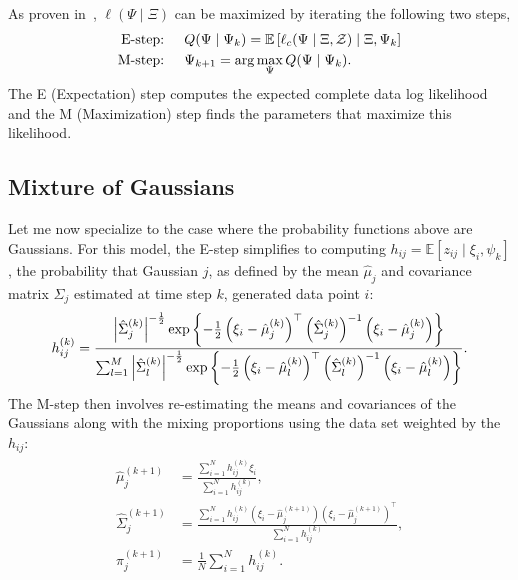 As proven in~\cite{dempster1977maximum}, $\ell(\Psi \mid \Xi)$ can be maximized
by iterating the following two steps,
%
\begin{align}
    \begin{split}
    \text{E-step: } \quad &Q(\Psi \mid \Psi_k) = \mathbb{E}\left[ \ell_c(\Psi \mid \Xi, \mathcal{Z}) \mid \Xi, \Psi_k \right] \\
    \text{M-step: } \quad &\Psi_{k+1} = \arg \max_\Psi Q(\Psi \mid \Psi_k).
    \end{split}
    \label{eq:EM_alg}
\end{align}
%
The E (Expectation) step computes the expected complete data log likelihood and 
the M (Maximization) step finds the parameters that maximize this likelihood.

\subsection{Mixture of Gaussians}
Let me now specialize to the case where the probability functions above are
Gaussians. For this model, the E-step simplifies to computing $h_{ij} =
\mathbb{E}\left[ z_{ij} \mid \xi_i, \psi_k \right]$, the probability that
Gaussian $j$, as defined by the mean $\hat{\mu}_j$ and covariance matrix
$\hat{\Sigma}_j$ estimated at time step $k$, generated data point $i$:
%
\begin{equation}
    h_{ij}^{(k)} = \frac{\left|{\hat{\Sigma}_j^{(k)}}\right|^{-\frac{1}{2}} 
    \exp{\left\{-\frac{1}{2}\left( \xi_i - \hat{\mu}_j^{(k)} \right)^\top 
    \left({\hat{\Sigma}_j^{(k)}}\right)^{-1} \left( \xi_i - \hat{\mu}_j^{(k)} \right) \right\}}  }
    {\sum_{l=1}^M \left|{\hat{\Sigma}_l^{(k)}}\right|^{-\frac{1}{2}} 
    \exp{\left\{-\frac{1}{2}\left( \xi_i - \hat{\mu}_l^{(k)} \right)^\top 
    \left({\hat{\Sigma}_l^{(k)}}\right)^{-1} \left( \xi_i - \hat{\mu}_l^{(k)} \right) \right\}} }.
    \label{eq:E-step}
\end{equation}
%
The M-step then involves re-estimating the means and covariances of the
Gaussians along with the mixing proportions using the data set weighted by the
$h_{ij}$:
%
\begin{align}
    \begin{split}
    \hat{\mu}_j^{(k+1)} &= \frac{\sum_{i=1}^N h_{ij}^{(k)}\xi_i}{\sum_{i=1}^N h_{ij}^{(k)}}, \\
    \hat{\Sigma}_j^{(k+1)} &= \frac{\sum_{i=1}^N h_{ij}^{(k)} \left(\xi_i - \hat{\mu}_j^{(k+1)}\right)
                    \left(\xi_i - \hat{\mu}_j^{(k+1)}\right)^\top}{\sum_{i=1}^N h_{ij}^{(k)}}, \\
    \pi_j^{(k+1)} &= \frac{1}{N}\sum_{i=1}^N h_{ij}^{(k)}.
    \end{split}
    \label{eq:M-step}
\end{align}


